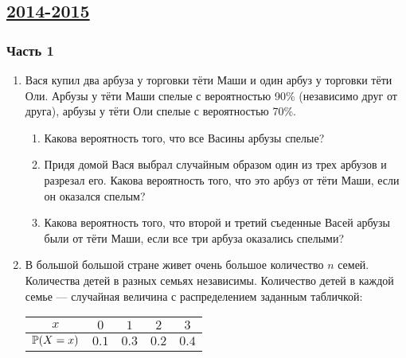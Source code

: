 \newpage
\subsection[2014-2015]{\hyperref[sec:sol_kr_01_ip_2014_2015]{2014-2015}}
\label{sec:kr_01_ip_2014_2015}

\subsubsection*{ Часть 1}

\begin{enumerate}


\item Вася купил два арбуза у торговки тёти Маши и один арбуз у торговки тёти Оли.
Арбузы у тёти Маши спелые с вероятностью 90\% (независимо друг от друга), арбузы
у тёти Оли спелые с вероятностью 70\%.
\begin{enumerate}
\item Какова вероятность того, что все Васины арбузы спелые?
\item Придя домой Вася выбрал случайным образом один из трех арбузов и разрезал его.
Какова вероятность того, что это арбуз от тёти Маши, если он оказался спелым?
\item Какова вероятность того, что второй и третий съеденные Васей арбузы были от
тёти Маши, если все три арбуза оказались спелыми?
\end{enumerate}


\item В большой большой стране живет очень большое количество $n$ семей.
Количества детей в разных семьях независимы. Количество детей в каждой семье —
случайная величина с распределением заданным табличкой:

\begin{center}
\begin{tabular}{ccccc}
\toprule
$x$ & $0$ & $1$ & $2$ & $3$ \\ \midrule
$\P(X=x)$ & $0.1$ & $0.3$ & $0.2$ & $0.4$ \\ \bottomrule
\end{tabular}
\end{center}


\end{enumerate}
